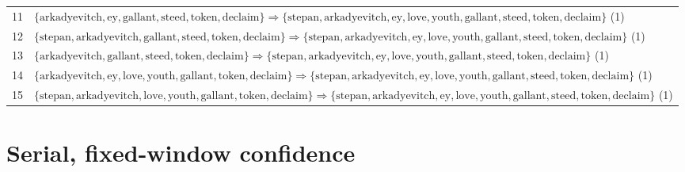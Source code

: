 \begin{appendices}
\begin{longtable}{p{20pt}|p{\dimexpr\textwidth-\tabcolsep-20pt\relax}}
11 & $ \{ \text{arkadyevitch},\allowbreak\text{ey},\allowbreak\text{gallant},\allowbreak\text{steed},\allowbreak\text{token},\allowbreak\text{declaim} \} \Rightarrow \{ \text{stepan},\allowbreak\text{arkadyevitch},\allowbreak\text{ey},\allowbreak\text{love},\allowbreak\text{youth},\allowbreak\text{gallant},\allowbreak\text{steed},\allowbreak\text{token},\allowbreak\text{declaim} \} $ (1) \\
12 & $ \{ \text{stepan},\allowbreak\text{arkadyevitch},\allowbreak\text{gallant},\allowbreak\text{steed},\allowbreak\text{token},\allowbreak\text{declaim} \} \Rightarrow \{ \text{stepan},\allowbreak\text{arkadyevitch},\allowbreak\text{ey},\allowbreak\text{love},\allowbreak\text{youth},\allowbreak\text{gallant},\allowbreak\text{steed},\allowbreak\text{token},\allowbreak\text{declaim} \} $ (1) \\
13 & $ \{ \text{arkadyevitch},\allowbreak\text{gallant},\allowbreak\text{steed},\allowbreak\text{token},\allowbreak\text{declaim} \} \Rightarrow \{ \text{stepan},\allowbreak\text{arkadyevitch},\allowbreak\text{ey},\allowbreak\text{love},\allowbreak\text{youth},\allowbreak\text{gallant},\allowbreak\text{steed},\allowbreak\text{token},\allowbreak\text{declaim} \} $ (1) \\
14 & $ \{ \text{arkadyevitch},\allowbreak\text{ey},\allowbreak\text{love},\allowbreak\text{youth},\allowbreak\text{gallant},\allowbreak\text{token},\allowbreak\text{declaim} \} \Rightarrow \{ \text{stepan},\allowbreak\text{arkadyevitch},\allowbreak\text{ey},\allowbreak\text{love},\allowbreak\text{youth},\allowbreak\text{gallant},\allowbreak\text{steed},\allowbreak\text{token},\allowbreak\text{declaim} \} $ (1) \\
15 & $ \{ \text{stepan},\allowbreak\text{arkadyevitch},\allowbreak\text{love},\allowbreak\text{youth},\allowbreak\text{gallant},\allowbreak\text{token},\allowbreak\text{declaim} \} \Rightarrow \{ \text{stepan},\allowbreak\text{arkadyevitch},\allowbreak\text{ey},\allowbreak\text{love},\allowbreak\text{youth},\allowbreak\text{gallant},\allowbreak\text{steed},\allowbreak\text{token},\allowbreak\text{declaim} \} $ (1) \\
\end{longtable}

\section{Serial, fixed-window confidence}


\end{appendices}
